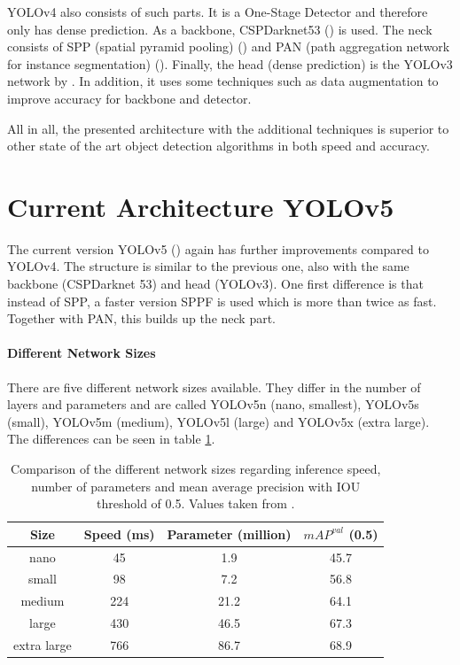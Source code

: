 YOLOv4 \cite{yolov4} also consists of such parts. It is a One-Stage Detector and therefore only has dense prediction. As a backbone, CSPDarknet53 (\cite{Wang_2020_CVPR_Workshops}) is used. The neck consists of SPP (spatial pyramid pooling) (\cite{7005506}) and PAN (path aggregation network for instance segmentation) (\cite{Liu_2018_CVPR}). Finally, the head (dense prediction) is the YOLOv3 network by \cite{yolov3}. In addition, it uses some techniques such as data augmentation to improve accuracy for backbone and detector. 

All in all, the presented architecture with the additional techniques is superior to other state of the art object detection algorithms in both speed and accuracy. 

\section{Current Architecture YOLOv5} 

The current version YOLOv5 (\cite{yolov5}) again has further improvements compared to YOLOv4. The structure is similar to the previous one, also with the same backbone (CSPDarknet 53) and head (YOLOv3). One first difference is that instead of SPP, a faster version SPPF is used which is more than twice as fast. Together with PAN, this builds up the neck part.

\paragraph{Different Network Sizes}
There are five different network sizes available. They differ in the number of layers and parameters and are called YOLOv5n (nano, smallest), YOLOv5s (small), YOLOv5m (medium), YOLOv5l (large) and YOLOv5x (extra large). The differences can be seen in table \ref{tab:network_sizes}.

\begin{table}[h!]
	\centering
	\begin{tabular}{|c c c c|} 
		\hline
		Size & Speed (ms) & Parameter (million) & $ mAP^{val} $ (0.5)\\ %
		\hline
		nano & 45 & 1.9 & 45.7 \\
		small & 98 & 7.2 & 56.8 \\
		medium & 224 & 21.2 & 64.1 \\
		large & 430 & 46.5 & 67.3 \\
		extra large & 766 & 86.7 & 68.9 \\
		\hline
	\end{tabular}
	\caption{Comparison of the different network sizes regarding inference speed, number of parameters and mean average precision with IOU threshold of 0.5. Values taken from \cite{yolov5}.}
	\label{tab:network_sizes}
\end{table}

